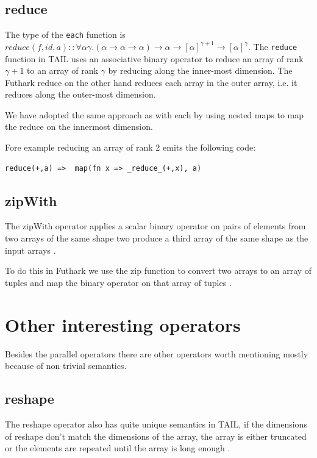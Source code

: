 \documentclass[11pt]{article}
\begin{document}
\subsection{reduce}
The type of the {\tt each} function is $reduce(f,id,a) :: \forall\alpha\gamma.(\alpha \to \alpha \to \alpha) \to \alpha \to [\alpha]^{\gamma+1} \to [\alpha]^\gamma$.
The {\tt reduce} function in TAIL uses an associative binary operator to reduce an array of rank
$\gamma+1$ to an array of rank $\gamma$ by reducing along the inner-most dimension\cite{ElsmanDybdal:Array:2014}.
The Futhark reduce on the other hand reduces each array in the outer array, i.e. it reduces along the outer-most dimension\cite{TroelsHenriksen}. 

We have adopted the same approach as with each by using nested maps to map the reduce on the innermost dimension.

Fore example reducing an array of rank 2 emits the following code:

\begin{lstlisting}[numbers=none,frame=none]
reduce(+,a)	=> 	map(fn x => _reduce_(+,x), a)
\end{lstlisting}

\subsection{zipWith}

The zipWith operator applies a scalar binary operator on pairs of elements from two arrays of the same shape two
produce a third array of the same shape as the input arrays \cite{ElsmanDybdal:Array:2014}.

To do this in Futhark we use the zip function to convert two arrays to an array of tuples and map the binary operator on that array of tuples \cite{TroelsHenriksen}.

\section{Other interesting operators}

Besides the parallel operators there are other operators worth mentioning mostly because of non trivial semantics.  

\subsection{reshape}

The reshape operator also has quite unique semantics in TAIL, if the dimensions of reshape don't match the dimensions of the array, the
array is either truncated or the elements are repeated until the array is long enough \cite{ElsmanDybdal:Array:2014}.
\end{document}
